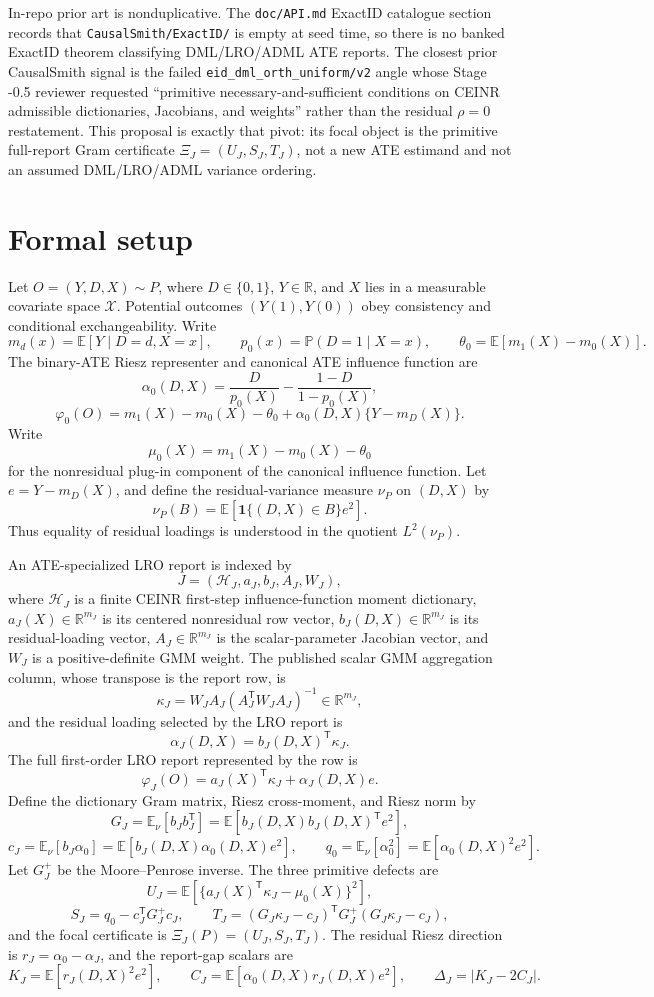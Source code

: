 \documentclass[11pt]{article}
\newcommand{\E}{\mathbb{E}}
\renewcommand{\Pr}{\mathbb{P}}
\newcommand{\one}{\mathbf{1}}
\newcommand{\transpose}{\mathsf{T}}
\newcommand{\R}{\mathbb{R}}
\theoremstyle{definition}
\theoremstyle{plain}
\theoremstyle{remark}
\begin{document}
In-repo prior art is nonduplicative.  The \texttt{doc/API.md} ExactID catalogue
section records that \texttt{CausalSmith/ExactID/} is empty at seed time, so
there is no banked ExactID theorem classifying DML/LRO/ADML ATE reports.  The
closest prior CausalSmith signal is the failed
\texttt{eid\_dml\_orth\_uniform/v2} angle whose Stage -0.5 reviewer requested
``primitive necessary-and-sufficient conditions on CEINR admissible
dictionaries, Jacobians, and weights'' rather than the residual
\(\rho=0\) restatement.  This proposal is exactly that pivot: its focal object
is the primitive full-report Gram certificate \(\Xi_J=(U_J,S_J,T_J)\), not a new ATE
estimand and not an assumed DML/LRO/ADML variance ordering.

\section{Formal setup}
Let \(O=(Y,D,X)\sim P\), where \(D\in\{0,1\}\), \(Y\in\R\), and \(X\) lies in
a measurable covariate space \(\mathcal X\).  Potential outcomes
\((Y(1),Y(0))\) obey consistency and conditional exchangeability.  Write
\[
m_d(x)=\E[Y\mid D=d,X=x],\qquad p_0(x)=\Pr(D=1\mid X=x),
\qquad \theta_0=\E[m_1(X)-m_0(X)].
\]
The binary-ATE Riesz representer and canonical ATE influence function are
\[
\alpha_0(D,X)=\frac{D}{p_0(X)}-\frac{1-D}{1-p_0(X)},
\]
\[
\varphi_0(O)=m_1(X)-m_0(X)-\theta_0+\alpha_0(D,X)\{Y-m_D(X)\}.
\]
Write
\[
\mu_0(X)=m_1(X)-m_0(X)-\theta_0
\]
for the nonresidual plug-in component of the canonical influence function.
Let \(e=Y-m_D(X)\), and define the residual-variance measure \(\nu_P\) on
\((D,X)\) by
\[
\nu_P(B)=\E[\one\{(D,X)\in B\}e^2].
\]
Thus equality of residual loadings is understood in the quotient \(L^2(\nu_P)\).

An ATE-specialized LRO report is indexed by
\[
J=(\mathcal H_J,a_J,b_J,A_J,W_J),
\]
where \(\mathcal H_J\) is a finite CEINR first-step influence-function moment
dictionary, \(a_J(X)\in\R^{m_J}\) is its centered nonresidual row vector,
\(b_J(D,X)\in\R^{m_J}\) is its residual-loading vector, \(A_J\in\R^{m_J}\) is
the scalar-parameter Jacobian vector, and \(W_J\) is a positive-definite GMM
weight.  The published scalar GMM aggregation column,
whose transpose is the report row, is
\[
\kappa_J=W_JA_J(A_J^\transpose W_JA_J)^{-1}\in\R^{m_J},
\]
and the residual loading selected by the LRO report is
\[
\alpha_J(D,X)=b_J(D,X)^\transpose\kappa_J.
\]
The full first-order LRO report represented by the row is
\[
\varphi_J(O)=a_J(X)^\transpose\kappa_J+\alpha_J(D,X)e.
\]
Define the dictionary Gram matrix, Riesz cross-moment, and Riesz norm by
\[
G_J=\E_\nu[b_Jb_J^\transpose]=\E[b_J(D,X)b_J(D,X)^\transpose e^2],
\]
\[
c_J=\E_\nu[b_J\alpha_0]=\E[b_J(D,X)\alpha_0(D,X)e^2],
\qquad
q_0=\E_\nu[\alpha_0^2]=\E[\alpha_0(D,X)^2e^2].
\]
Let \(G_J^+\) be the Moore--Penrose inverse.  The three primitive defects are
\[
U_J=\E\left[\{a_J(X)^\transpose\kappa_J-\mu_0(X)\}^2\right],
\]
\[
S_J=q_0-c_J^\transpose G_J^+c_J,\qquad
T_J=(G_J\kappa_J-c_J)^\transpose G_J^+(G_J\kappa_J-c_J),
\]
and the focal certificate is \(\Xi_J(P)=(U_J,S_J,T_J)\).  The residual Riesz
direction is \(r_J=\alpha_0-\alpha_J\), and the report-gap scalars are
\[
K_J=\E[r_J(D,X)^2e^2],\qquad
C_J=\E[\alpha_0(D,X)r_J(D,X)e^2],\qquad
\Delta_J=|K_J-2C_J|.
\]
\end{document}
